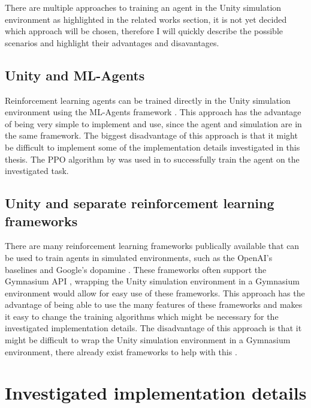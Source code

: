 There are multiple approaches to training an agent in the Unity simulation environment as highlighted in the related works section, it is not yet decided which approach will be chosen, therefore I will quickly describe the possible scenarios and highlight their advantages and disavantages.

\subsection*{Unity and ML-Agents}

Reinforcement learning agents can be trained directly in the Unity simulation environment using the ML-Agents framework \autocite{mlagents}. This approach has the advantage of being very simple to implement and use, since the agent and simulation are in the same framework. The biggest disadvantage of this approach is that it might be difficult to implement some of the implementation details investigated in this thesis. %
The PPO algorithm by \autocite{mlagents} was used in \autocite{maximilian} to successfully train the agent on the investigated task.

\subsection*{Unity and separate reinforcement learning frameworks}

There are many reinforcement learning frameworks publically available that can be used to train agents in simulated environments, such as the OpenAI's baselines \autocite{sb3} and Google's dopamine \autocite{dopamine}. These frameworks often support the Gymnasium API \autocite{gymnasium}, wrapping the Unity simulation environment in a Gymnasium environment would allow for easy use of these frameworks. This approach has the advantage of being able to use the many features of these frameworks and makes it easy to change the training algorithms which might be necessary for the investigated implementation details. The disadvantage of this approach is that it might be difficult to wrap the Unity simulation environment in a Gymnasium environment, there already exist frameworks to help with this \autocite{peacefulpie}.




\section{Investigated implementation details}


